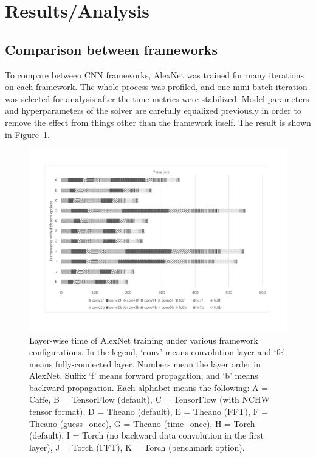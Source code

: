 \section{Results/Analysis}

\subsection{Comparison between frameworks}
To compare between CNN frameworks, AlexNet was trained for many iterations on each framework.
The whole process was profiled, and one mini-batch iteration was selected for analysis after the time metrics were stabilized.
Model parameters and hyperparameters of the solver are carefully equalized previously in order to remove the effect from things other than the framework itself.
The result is shown in Figure~\ref{fig_time_frameworks}.

\begin{figure}
  \centering
  \includegraphics[width=\linewidth]{./figures/time_frameworks}
  \caption{%
Layer-wise time of AlexNet training under various framework configurations.
In the legend, `conv' means convolution layer and `fc' means fully-connected layer.
Numbers mean the layer order in AlexNet.
Suffix `f' means forward propagation, and `b' means backward propagation.
Each alphabet means the following: A = Caffe, B = TensorFlow (default), C = TensorFlow (with NCHW tensor format), D = Theano (default), E = Theano (FFT), F = Theano (guess\_once), G = Theano (time\_once), H = Torch (default), I = Torch (no backward data convolution in the first layer), J = Torch (FFT), K = Torch (benchmark option).
\label{fig_time_frameworks}
  }
\end{figure}

